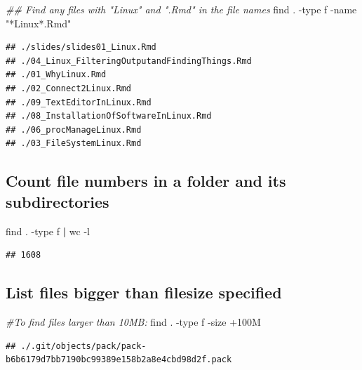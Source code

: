 \documentclass[]{book}
\makeatletter
\newenvironment{Shaded}{\begin{snugshade}}{\end{snugshade}}
\newcommand{\CommentTok}[1]{\textcolor[rgb]{0.56,0.35,0.01}{\textit{#1}}}
\newcommand{\FunctionTok}[1]{\textcolor[rgb]{0.00,0.00,0.00}{#1}}
\newcommand{\KeywordTok}[1]{\textcolor[rgb]{0.13,0.29,0.53}{\textbf{#1}}}
\newcommand{\NormalTok}[1]{#1}
\newcommand{\StringTok}[1]{\textcolor[rgb]{0.31,0.60,0.02}{#1}}
\newenvironment{kframe}{%
\medskip{}
\setlength{\fboxsep}{.8em}
 \def\at@end@of@kframe{}%
 \ifinner\ifhmode%
  \def\at@end@of@kframe{\end{minipage}}%
  \begin{minipage}{\columnwidth}%
 \fi\fi%
 \def\FrameCommand##1{\hskip\@totalleftmargin \hskip-\fboxsep
 \colorbox{shadecolor}{##1}\hskip-\fboxsep
     \hskip-\linewidth \hskip-\@totalleftmargin \hskip\columnwidth}%
 \MakeFramed {\advance\hsize-\width
   \@totalleftmargin\z@ \linewidth\hsize
   \@setminipage}}%
 {\par\unskip\endMakeFramed%
 \at@end@of@kframe}
\renewenvironment{Shaded}{\begin{kframe}}{\end{kframe}}
\makeatother
\begin{document}
\begin{Shaded}
\begin{Highlighting}[]
\CommentTok{## Find any files with "Linux" and ".Rmd" in the file names}
\FunctionTok{find}\NormalTok{ . -type f -name }\StringTok{"*Linux*.Rmd"}
\end{Highlighting}
\end{Shaded}

\begin{verbatim}
## ./slides/slides01_Linux.Rmd
## ./04_Linux_FilteringOutputandFindingThings.Rmd
## ./01_WhyLinux.Rmd
## ./02_Connect2Linux.Rmd
## ./09_TextEditorInLinux.Rmd
## ./08_InstallationOfSoftwareInLinux.Rmd
## ./06_procManageLinux.Rmd
## ./03_FileSystemLinux.Rmd
\end{verbatim}

\hypertarget{count-file-numbers-in-a-folder-and-its-subdirectories}{%
\subsection{Count file numbers in a folder and its subdirectories}\label{count-file-numbers-in-a-folder-and-its-subdirectories}}

\begin{Shaded}
\begin{Highlighting}[]
\FunctionTok{find}\NormalTok{ . -type f }\KeywordTok{|} \FunctionTok{wc}\NormalTok{ -l}
\end{Highlighting}
\end{Shaded}

\begin{verbatim}
## 1608
\end{verbatim}

\hypertarget{list-files-bigger-than-filesize-specified}{%
\subsection{List files bigger than filesize specified}\label{list-files-bigger-than-filesize-specified}}

\begin{Shaded}
\begin{Highlighting}[]
\CommentTok{#To find files larger than 10MB:}
\FunctionTok{find}\NormalTok{ . -type f -size +100M}
\end{Highlighting}
\end{Shaded}

\begin{verbatim}
## ./.git/objects/pack/pack-b6b6179d7bb7190bc99389e158b2a8e4cbd98d2f.pack
\end{verbatim}
\end{document}

